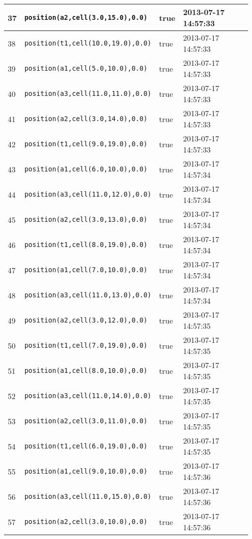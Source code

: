 \documentclass[11pt]{article}\usepackage[utf8]{inputenc}\usepackage{geometry}
\begin{document}
\begin{table}[ht]
\begin{tabular}{l l l l}
37&\texttt{position(a2,cell(3.0,15.0),0.0)}&true&2013-07-17 14:57:33\\ [1ex] \hline
38&\texttt{position(t1,cell(10.0,19.0),0.0)}&true&2013-07-17 14:57:33\\ [1ex] \hline
39&\texttt{position(a1,cell(5.0,10.0),0.0)}&true&2013-07-17 14:57:33\\ [1ex] \hline
40&\texttt{position(a3,cell(11.0,11.0),0.0)}&true&2013-07-17 14:57:33\\ [1ex] \hline
41&\texttt{position(a2,cell(3.0,14.0),0.0)}&true&2013-07-17 14:57:33\\ [1ex] \hline
42&\texttt{position(t1,cell(9.0,19.0),0.0)}&true&2013-07-17 14:57:33\\ [1ex] \hline
43&\texttt{position(a1,cell(6.0,10.0),0.0)}&true&2013-07-17 14:57:34\\ [1ex] \hline
44&\texttt{position(a3,cell(11.0,12.0),0.0)}&true&2013-07-17 14:57:34\\ [1ex] \hline
45&\texttt{position(a2,cell(3.0,13.0),0.0)}&true&2013-07-17 14:57:34\\ [1ex] \hline
46&\texttt{position(t1,cell(8.0,19.0),0.0)}&true&2013-07-17 14:57:34\\ [1ex] \hline
47&\texttt{position(a1,cell(7.0,10.0),0.0)}&true&2013-07-17 14:57:34\\ [1ex] \hline
48&\texttt{position(a3,cell(11.0,13.0),0.0)}&true&2013-07-17 14:57:34\\ [1ex] \hline
49&\texttt{position(a2,cell(3.0,12.0),0.0)}&true&2013-07-17 14:57:35\\ [1ex] \hline
50&\texttt{position(t1,cell(7.0,19.0),0.0)}&true&2013-07-17 14:57:35\\ [1ex] \hline
51&\texttt{position(a1,cell(8.0,10.0),0.0)}&true&2013-07-17 14:57:35\\ [1ex] \hline
52&\texttt{position(a3,cell(11.0,14.0),0.0)}&true&2013-07-17 14:57:35\\ [1ex] \hline
53&\texttt{position(a2,cell(3.0,11.0),0.0)}&true&2013-07-17 14:57:35\\ [1ex] \hline
54&\texttt{position(t1,cell(6.0,19.0),0.0)}&true&2013-07-17 14:57:35\\ [1ex] \hline
55&\texttt{position(a1,cell(9.0,10.0),0.0)}&true&2013-07-17 14:57:36\\ [1ex] \hline
56&\texttt{position(a3,cell(11.0,15.0),0.0)}&true&2013-07-17 14:57:36\\ [1ex] \hline
57&\texttt{position(a2,cell(3.0,10.0),0.0)}&true&2013-07-17 14:57:36\\ [1ex] \hline

\end{tabular}
\end{table}
\end{document}

